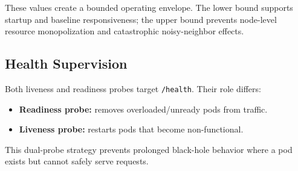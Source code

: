 \documentclass[11pt,a4paper]{article}
\begin{document}
These values create a bounded operating envelope. The lower bound supports startup and baseline responsiveness; the upper bound prevents node-level resource monopolization and catastrophic noisy-neighbor effects.

\subsection{Health Supervision}
Both liveness and readiness probes target \texttt{/health}. Their role differs:

\begin{itemize}[leftmargin=1.5em]
	\item \textbf{Readiness probe:} removes overloaded/unready pods from traffic.
	\item \textbf{Liveness probe:} restarts pods that become non-functional.
\end{itemize}

This dual-probe strategy prevents prolonged black-hole behavior where a pod exists but cannot safely serve requests.
\end{document}
